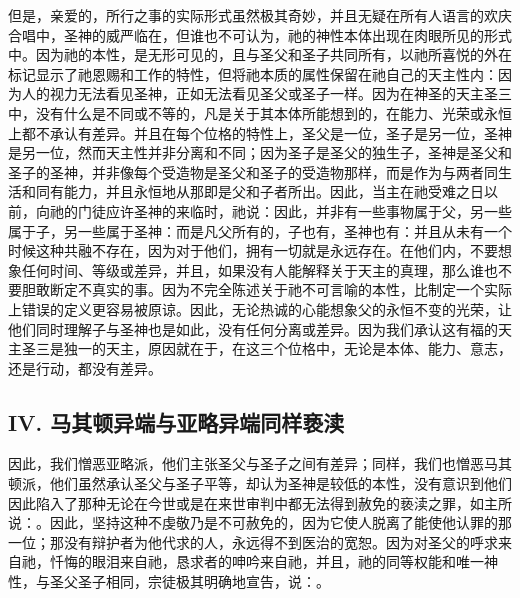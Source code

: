 但是，亲爱的，所行之事的实际形式虽然极其奇妙，并且无疑在所有人语言的欢庆合唱中，圣神的威严临在，但谁也不可认为，祂的神性本体出现在肉眼所见的形式中。因为祂的本性，是无形可见的，且与圣父和圣子共同所有，以祂所喜悦的外在标记显示了祂恩赐和工作的特性，但将祂本质的属性保留在祂自己的天主性内：因为人的视力无法看见圣神，正如无法看见圣父或圣子一样。因为在神圣的天主圣三中，没有什么是不同或不等的，凡是关于其本体所能想到的，在能力、光荣或永恒上都不承认有差异。并且在每个位格的特性上，圣父是一位，圣子是另一位，圣神是另一位，然而天主性并非分离和不同；因为圣子是圣父的独生子，圣神是圣父和圣子的圣神，并非像每个受造物是圣父和圣子的受造物那样，而是作为与两者同生活和同有能力，并且永恒地从那即是父和子者所出。因此，当主在祂受难之日以前，向祂的门徒应许圣神的来临时，祂说：因此，并非有一些事物属于父，另一些属于子，另一些属于圣神：而是凡父所有的，子也有，圣神也有：并且从未有一个时候这种共融不存在，因为对于他们，拥有一切就是永远存在。在他们内，不要想象任何时间、等级或差异，并且，如果没有人能解释关于天主的真理，那么谁也不要胆敢断定不真实的事。因为不完全陈述关于祂不可言喻的本性，比制定一个实际上错误的定义更容易被原谅。因此，无论热诚的心能想象父的永恒不变的光荣，让他们同时理解子与圣神也是如此，没有任何分离或差异。因为我们承认这有福的天主圣三是独一的天主，原因就在于，在这三个位格中，无论是本体、能力、意志，还是行动，都没有差异。\par


\subsection{IV. 马其顿异端与亚略异端同样亵渎}

因此，我们憎恶亚略派，他们主张圣父与圣子之间有差异；同样，我们也憎恶马其顿派，他们虽然承认圣父与圣子平等，却认为圣神是较低的本性，没有意识到他们因此陷入了那种无论在今世或是在来世审判中都无法得到赦免的亵渎之罪，如主所说：。因此，坚持这种不虔敬乃是不可赦免的，因为它使人脱离了能使他认罪的那一位；那没有辩护者为他代求的人，永远得不到医治的宽恕。因为对圣父的呼求来自祂，忏悔的眼泪来自祂，恳求者的呻吟来自祂，并且，祂的同等权能和唯一神性，与圣父圣子相同，宗徒极其明确地宣告，说：。\par

